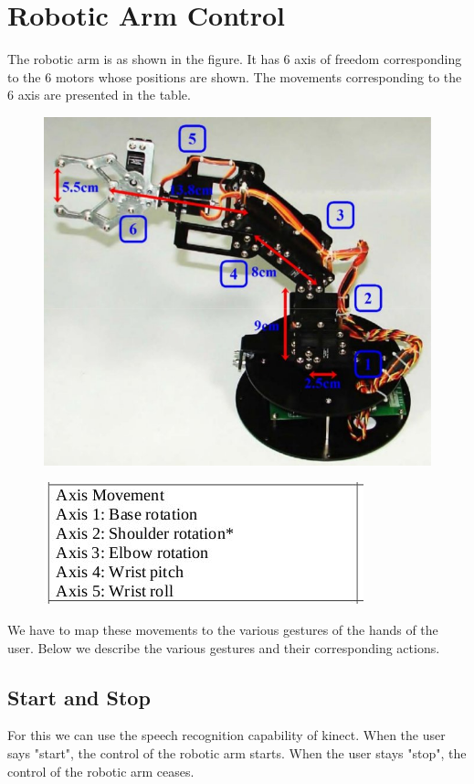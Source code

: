 \documentclass[a4wide]{scrreprt}
\begin{document}
\chapter{Robotic Arm Control}
The robotic arm is as shown in the figure. It has 6 axis of freedom corresponding to the 6 motors whose positions are shown. The movements corresponding to the 6 axis are presented in the table.
\begin{figure}[H]
\centering
\includegraphics[scale=0.5]{arm-axes.jpg}
\end{figure}

\begin{figure}[H]
\centering
\includegraphics[scale=0.8]{arm-axes-table.jpg}
\end{figure}
We have to map these movements to the various gestures of the hands of the user. Below we describe the various gestures and their corresponding actions.
\section*{Start and Stop}
For this we can use the speech recognition capability of kinect. When the user says "start", the control of the robotic arm starts. When the user stays "stop", the control of the robotic arm ceases.
\end{document}
